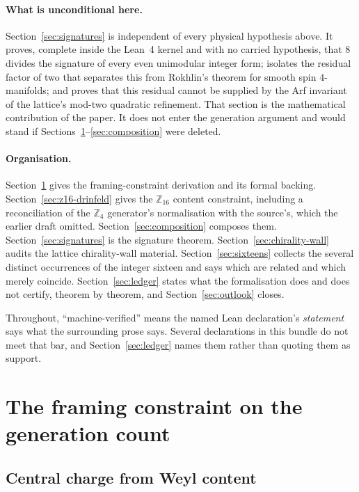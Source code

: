 \documentclass[aps,prd,reprint,nofootinbib,superscriptaddress]{revtex4-2}
\begin{document}
\paragraph{What is unconditional here.}
Section~\ref{sec:signatures} is independent of every physical hypothesis
above. It proves, complete inside the Lean~4 kernel and with no carried
hypothesis, that $8$ divides the signature of every even unimodular
integer form; isolates the residual factor of two that separates this
from Rokhlin's theorem for smooth spin $4$-manifolds; and proves that
this residual cannot be supplied by the Arf invariant of the lattice's
mod-two quadratic refinement. That section is the mathematical
contribution of the paper. It does not enter the generation argument and
would stand if Sections~\ref{sec:modular}--\ref{sec:composition} were
deleted.

\paragraph{Organisation.}
Section~\ref{sec:modular} gives the framing-constraint derivation and its
formal backing. Section~\ref{sec:z16-drinfeld} gives the
$\mathbb{Z}_{16}$ content constraint, including a reconciliation of the
$\mathbb{Z}_4$ generator's normalisation with the source's, which the
earlier draft omitted. Section~\ref{sec:composition} composes them.
Section~\ref{sec:signatures} is the signature theorem.
Section~\ref{sec:chirality-wall} audits the lattice chirality-wall
material. Section~\ref{sec:sixteens} collects the several distinct
occurrences of the integer sixteen and says which are related and which
merely coincide. Section~\ref{sec:ledger} states what the formalisation
does and does not certify, theorem by theorem, and
Section~\ref{sec:outlook} closes.

Throughout, ``machine-verified'' means the named Lean declaration's
\emph{statement} says what the surrounding prose says. Several
declarations in this bundle do not meet that bar, and
Section~\ref{sec:ledger} names them rather than quoting them as support.

\section{The framing constraint on the generation count}
\label{sec:modular}

\subsection{Central charge from Weyl content}
\end{document}
